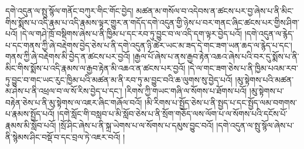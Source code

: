 དགེ་འདུན་ལ་སྤུ་སྙོལ་གནོང་བཀུར་གིང་གོང་བྱེད། མཚན་མ་གསོལ་བ་འདེབས་ན་ཚངས་པར་བྱ་ཞེས་པ་ནི་མིང་གིས་སྨོས་པ་འདི་རྣམ་པ་འདི་རྣམས་ལྟར་གྱུར་ན་གདོད་དགེ་འདུན་གྱི་ཉེས་པ་བར་གནང་ཞིང་ཚངས་པར་གྱིས་ཤིག་པའོ། །དེ་ལ་གཤེ་ཁྲོ་བསྡིགས་ཞེས་པ་ནི་ཁྱིམ་པ་དང་རབ་ཏུ་བྱུང་བ་ལ་འདི་དག་ལྟར་བྱེད་པའོ། །དགེ་འདུན་ལ་རྙེད་པ་དང་གནས་ཀྱི་ཞེ་བརྡེགས་བྱེད་ཅེས་པ་ནི་དགེ་འདུན་ཉི་ཚེར་ཡང་མ་ཟད་དེ་གང་ཟག་ཡན་ཆད་ལ་རྙེད་པ་དང་། གནས་ཀྱི་ཞེ་བརྡེགས་མི་བྱེད་ན་ཚངས་པར་བྱའོ། །རྒྱལ་པོ་ཞེས་པ་ནས་རྒྱབ་རྟེན་འཆའ་ཞེས་པའི་བར་དུ་སྨོས་པ་ནི་མིང་གིས་སྨོས་པ་འདི་རྣམས་ལ་རྒྱབ་རྟེན་མི་འཆའ་ན་ཚངས་པར་བྱའོ། །དེ་ལ་གང་ཟག་ཅེས་པ་ནི་ཁྱིམ་པའམ་རབ་ཏུ་བྱུང་བ་གང་ཡང་རུང་ཁྱིམ་པའི་མཚན་མ་ནི་རབ་ཏུ་མ་བྱུང་བའི་ཆ་ལུགས་སུ་བྱེད་པའོ། །མུ་སྟེགས་པའི་མཚན་མ་ཤེས་པ་ནི་འཕྲལ་བ་ལ་སོ་རིས་བྱེད་པ་དང་། །རིགས་ཀྱི་གཡང་གཞི་ལ་སོགས་པ་ཐོགས་པའོ། །མུ་སྟེགས་པ་བརྟེན་ཅེས་པ་ནི་མུ་སྟེགས་ལ་འཇར་ཞིང་གཞོལ་བའོ། །མི་རིགས་པ་སྤྱོད་ཅེས་པ་ནི་སྤྱད་པ་དང་སྤྱོད་ལམ་བགགས་པ་རྣམས་སྤྱོད་པའོ། །དགེ་སློང་གི་བསླབ་པ་མི་སློབ་ཅེས་པ་ནི་སྲོག་གཅོད་ལས་ལོག་པ་ལ་སོགས་པའི་དངོས་པོ་རྣམས་མི་སློབ་པའོ། །སྲོ་ཤིང་ཞེས་པ་ནི་སྐྲ་ཡེགས་པ་ལ་སོགས་པ་དམུས་བྱུང་བའོ། །དགེ་འདུན་ལ་སྤུ་སྙོལ་ཞེས་པ་ནི་སྙེམས་ཤིང་བསྡོ་བ་དང་བྲལ་ཏེ་འཇར་བའོ། །

